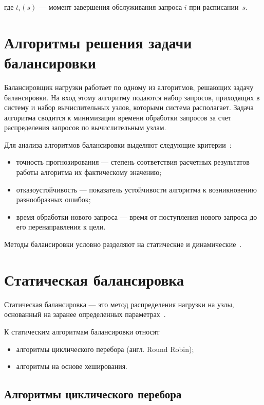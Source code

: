 где $t_i(s)$ --- момент завершения обслуживания запроса $i$ при расписании~$s$.

\section{Алгоритмы решения задачи балансировки}

Балансировщик нагрузки работает по одному из алгоритмов, решающих задачу балансировки.
На вход этому алгоритму подаются набор запросов, приходящих в систему и набор вычислительных узлов, которыми система располагает.
Задача алгоритма сводится к минимизации времени обработки запросов за счет распределения запросов по вычислительным узлам.

Для анализа алгоритмов балансировки выделяют следующие критерии~\cite{com_analysis}:
\begin{itemize}
	\item точность прогнозирования --- степень соответствия расчетных результатов работы алгоритма их фактическому значению;  
	\item отказоустойчивость --- показатель устойчивости алгоритма к возникновению разнообразных ошибок;
	\item время обработки нового запроса --- время от поступления нового запроса до его перенаправления к цели.
\end{itemize}

Методы балансировки условно разделяют на статические и динамические~\cite{drr, com_analysis, rate_comp}. 

\section{Статическая балансировка}

Статическая балансировка --- это метод распределения нагрузки на узлы, основанный на заранее определенных параметрах~\cite{com_analysis, intuit}.

К статическим алгоритмам балансировки относят~\mbox{\cite{nginx, aws, haproxy, part_algos, com_analysis}}
\begin{itemize}
	\item алгоритмы циклического перебора (англ. Round Robin);
	\item алгоритмы на основе хеширования.
\end{itemize}


\subsection{Алгоритмы циклического перебора}

